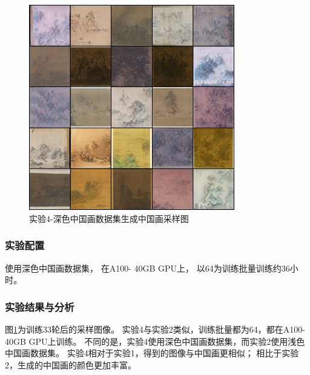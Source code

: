 \begin{figure}[H]
    \centering
    \includegraphics[width=0.8\textwidth]{figures/diffusion/results4/sample-33}
    \caption{实验4-深色中国画数据集生成中国画采样图}\label{fig:diffusion_results4_sample33}
\end{figure}

\subsubsection{实验配置}
使用深色中国画数据集，
在A100- 40GB GPU上，
以64为训练批量训练约36小时。
\subsubsection{实验结果与分析}


图{\ref{fig:diffusion_results4_sample33}}为训练33轮后的采样图像。
实验4与实验2类似，训练批量都为64，都在A100- 40GB GPU上训练。
不同的是，实验4使用深色中国画数据集，而实验2使用浅色中国画数据集。
实验4相对于实验1，得到的图像与中国画更相似；
相比于实验2，生成的中国画的颜色更加丰富。
